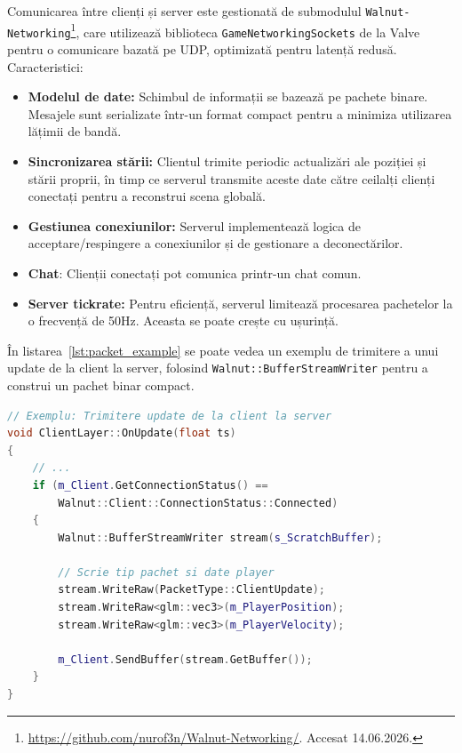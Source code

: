 \documentclass[12pt,a4paper]{report}
\numberwithin{equation}{section} %
\begin{document}
Comunicarea între clienți și server este gestionată de submodulul \texttt{Walnut-Networking}\footnote{\url{https://github.com/nurof3n/Walnut-Networking/}. Accesat 14.06.2026.}, care utilizează biblioteca \texttt{GameNetworkingSockets} de la Valve pentru o comunicare bazată pe UDP, optimizată pentru latență redusă.
Caracteristici:
\begin{itemize}
    \item \textbf{Modelul de date:} Schimbul de informații se bazează pe pachete binare.
        Mesajele sunt serializate într-un format compact pentru a minimiza utilizarea lățimii de bandă.
    \item \textbf{Sincronizarea stării:} Clientul trimite periodic actualizări ale poziției și stării proprii, în timp ce serverul transmite aceste date către ceilalți clienți conectați pentru a reconstrui scena globală.
    \item \textbf{Gestiunea conexiunilor:} Serverul implementează logica de acceptare/respingere a conexiunilor și de gestionare a deconectărilor.
    \item \textbf{Chat}: Clienții conectați pot comunica printr-un chat comun.
    \item \textbf{Server tickrate:} Pentru eficiență, serverul limitează procesarea pachetelor la o frecvență de 50Hz. Aceasta se poate crește cu ușurință.
\end{itemize}

În listarea~\ref{lst:packet_example} se poate vedea un exemplu de trimitere a unui update de la client la server, folosind \texttt{Walnut::BufferStreamWriter} pentru a construi un pachet binar compact.

\begin{lstlisting}[caption={Exemplu de trimitere a unui update de la client la server.}, language=C++, label=lst:packet_example, frame=single]
// Exemplu: Trimitere update de la client la server
void ClientLayer::OnUpdate(float ts)
{
    // ...
    if (m_Client.GetConnectionStatus() == 
        Walnut::Client::ConnectionStatus::Connected)
    {
        Walnut::BufferStreamWriter stream(s_ScratchBuffer);
        
        // Scrie tip pachet si date player
        stream.WriteRaw(PacketType::ClientUpdate);
        stream.WriteRaw<glm::vec3>(m_PlayerPosition);
        stream.WriteRaw<glm::vec3>(m_PlayerVelocity);
        
        m_Client.SendBuffer(stream.GetBuffer());
    }
}
\end{lstlisting}
\end{document}
